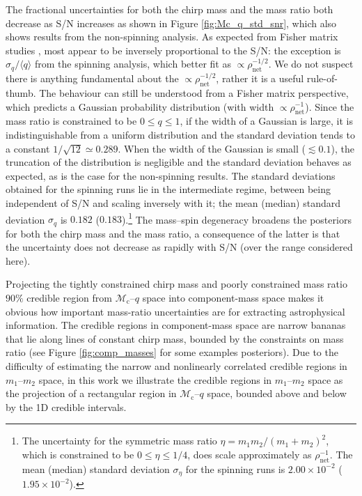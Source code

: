 The fractional uncertainties for both the chirp mass and the mass ratio both decrease as S/N increases as shown in Figure \ref{fig:Mc_q_std_snr}, which also shows results from the non-spinning analysis. As expected from Fisher matrix studies \citep[e.g.,]{FinnChernoff}, most appear to be inversely proportional to the S/N: the exception is $\sigma_q/\langle q\rangle$ from the spinning analysis, which better fit as $\propto \rho_\mathrm{net}^{-1/2}$. We do not suspect there is anything fundamental about the $\propto \rho_\mathrm{net}^{-1/2}$, rather it is a useful rule-of-thumb. The behaviour can still be understood from a Fisher matrix perspective, which predicts a Gaussian probability distribution (with width $\propto \rho_\mathrm{net}^{-1}$). Since the mass ratio is constrained to be $0 \leq q \leq 1$, if the width of a Gaussian is large, it is indistinguishable from a uniform distribution and the standard deviation tends to a constant $1/\sqrt{12} \simeq 0.289$. When the width of the Gaussian is small ($\lesssim 0.1$), the truncation of the distribution is negligible and the standard deviation behaves as expected, as is the case for the non-spinning results. The standard deviations obtained for the spinning runs lie in the intermediate regime, between being independent of S/N and scaling inversely with it; the mean (median) standard deviation $\sigma_q$ is $0.182$ ($0.183$).\footnote{The uncertainty  for the symmetric mass ratio $\eta = m_1m_2/(m_1 + m_2)^2$, which is constrained to be $0 \leq \eta \leq 1/4$, does scale approximately as $\rho_\mathrm{net}^{-1}$. The mean (median) standard deviation $\sigma_\eta$ for the spinning runs is $2.00\times 10^{-2}$ ($1.95\times 10^{-2}$).} The mass--spin degeneracy broadens the posteriors for both the chirp mass and the mass ratio, a consequence of the latter is that the uncertainty does not decrease as rapidly with S/N (over the range considered here). 
  
Projecting the tightly constrained chirp mass and poorly constrained mass ratio $90\%$ credible region from $\mathcal{M}_\mathrm{c}$--$q$ space into component-mass space makes it obvious how important mass-ratio uncertainties are for extracting astrophysical information.  The credible regions in component-mass space are narrow bananas that lie along lines of constant chirp mass, bounded by the constraints on mass ratio (see Figure \ref{fig:comp_masses} for some examples posteriors).  Due to the difficulty of estimating the narrow and nonlinearly correlated credible regions in $m_1$--$m_2$ space, in this work we illustrate the credible regions in $m_1$--$m_2$ space as the projection of a rectangular region in $\mathcal{M}_\mathrm{c}$--$q$ space, bounded above and below by the 1D credible intervals.
  
  
  
  
  
  
  
  
  